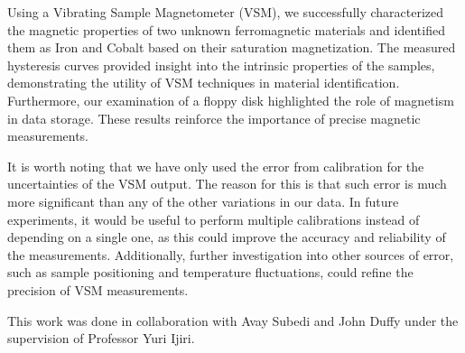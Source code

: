 \documentclass{../paper}
\begin{document}
Using a Vibrating Sample Magnetometer (VSM), we successfully characterized the magnetic properties of two unknown ferromagnetic materials and identified them as Iron and Cobalt based on their saturation magnetization. The measured hysteresis curves provided insight into the intrinsic properties of the samples, demonstrating the utility of VSM techniques in material identification. Furthermore, our examination of a floppy disk highlighted the role of magnetism in data storage. These results reinforce the importance of precise magnetic measurements.

It is worth noting that we have only used the  error from calibration for the uncertainties of the VSM output. The reason for this is that such error is much more significant than any of the other variations in our data. In future experiments, it would be useful to perform multiple calibrations instead of depending on a single one, as this could improve the accuracy and reliability of the measurements. Additionally, further investigation into other sources of error, such as sample positioning and temperature fluctuations, could refine the precision of VSM measurements.

\begin{acknowledgements}
  This work was done in collaboration with Avay Subedi and John Duffy under the supervision of Professor Yuri Ijiri.
\end{acknowledgements}


\end{document}
